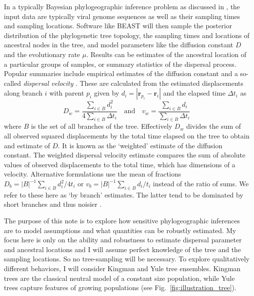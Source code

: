 \documentclass[aps,rmp, twocolumn]{revtex4}
\newcommand{\rvec}{\mathbf{r}}
\begin{document}
In a typically Bayesian phylogeographic inference problem as discussed in \citet{pybus_unifying_2012}, the input data are typically viral genome sequences as well as their sampling times and sampling locations.
Software like BEAST will then sample the posterior distribution of the phylogenetic tree topology, the sampling times and locations of ancestral nodes in the tree, and model parameters like the diffusion constant $D$ and the evolutionary rate $\mu$.
Results can be estimates of the ancestral location of a particular groups of samples, or summary statistics of the dispersal process.
Popular summaries include empirical estimates of the diffusion constant  \citep{pybus_unifying_2012} and a so-called \emph{dispersal velocity} \citep{dellicour_using_2017}. These are calculated from the estimated displacements along branch $i$ with parent $p_i$ given by $d_i = |\rvec_{p_i} - \rvec_{i}|$ and the elapsed time $\Delta t_i$ as
\begin{equation}
    \label{eq:disperal_parameters}
    D_w = \frac{\sum_{i\in B}d_i^2}{4\sum_{i\in B} \Delta t_i} \quad \mathrm{and}  \quad v_w = \frac{\sum_{i\in B} d_i}{\sum_{i\in B} \Delta t_i}
\end{equation}
where $B$ is the set of all branches of the tree.
Effectively $D_w$ divides the sum of all observed squared displacements by the total time elapsed on the tree to obtain and estimate of $D$.
It is known as the `weighted' estimate of the diffusion constant.
The weighted dispersal velocity estimate compares the sum of absolute values of observed displacements to the total time, which has dimensions of a velocity.
Alternative formulations use the mean of fractions $D_b = |B|^{-1} \sum_{i\in B}d_i^2/4t_i$ or $v_b = |B|^{-1} \sum_{i\in B}d_i/t_i$ instead of the ratio of sums.
We refer to these here as `by branch' estimates.
The latter tend to be dominated by short branches and thus noisier \citep{trovao_bayesian_2015}.


The purpose of this note is to explore how sensitive phylogeographic inferences are to model assumptions and what quantities can be robustly estimated.
My focus here is only on the ability and robustness to estimate dispersal parameter and ancestral locations and I will assume perfect knowledge of the tree and the sampling locations.
So no tree-sampling will be necessary.
To explore qualitatively different behaviors, I will consider Kingman and Yule tree ensembles. Kingman trees are the classical neutral model of a constant size population, while Yule trees capture features of growing populations (see Fig.~\ref{fig:illustration_tree}).
\end{document}
